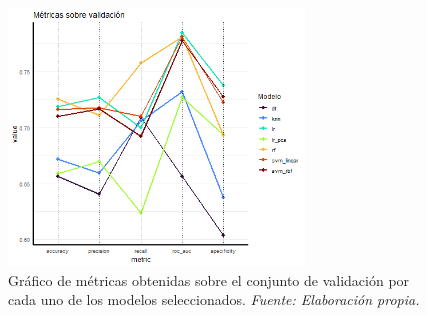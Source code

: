 \documentclass[12pt,a4paper,]{book}
\numberwithin{dummy}{section}
\theoremstyle{ocrenumbox}
\theoremstyle{blacknumex}
\theoremstyle{blacknumbox}
\theoremstyle{ocrenum}
\theoremstyle{ocrenum}
\begin{document}
\begin{table}[]
\centering
{}
\caption[Métricas de los modelos seleccionados sobre el conjunto de validación]{Métricas de los modelos seleccionados sobre el conjunto de validación.  \it Fuente: Elaboración propia.}
\label{tab:metricas_val}
\end{table}

\begin{figure}[h]
\centering
\includegraphics[width =0.7\textwidth]{graficos/validation_metrics.png}
\caption[Gráfico de métricas obtenidas sobre el conjunto de validación]{Gráfico de métricas obtenidas sobre el conjunto de validación por cada uno de los modelos seleccionados. \it Fuente: Elaboración propia.}
\label{fig:validation_metrics}
\end{figure}
\end{document}
